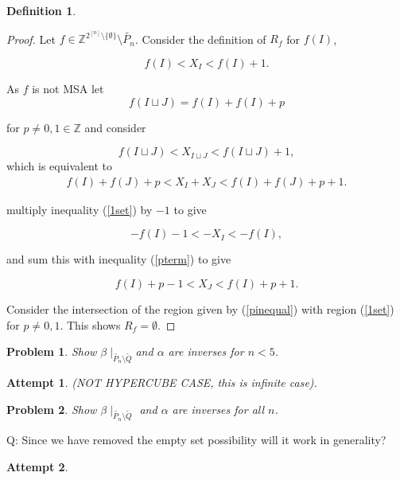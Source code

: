 \documentclass[a4paper,12pt]{article}
\newtheorem{problem}{Problem}
\newtheorem{attempt}{Attempt}
\theoremstyle{definition}
\newtheorem{definition}{Definition}[section]
\theoremstyle{indented}
\begin{document}
\begin{definition}
\begin{proof}
        Let $f \in \mathbb{Z}^{ 2^{[n]} \setminus \{\emptyset\}}  \setminus \tilde{P_n}$. Consider the definition of $R_f$ for $f(I)$,
        
        \begin{equation}\label{1set}
            f(I) < X_I < f(I) +1.
        \end{equation}
        
  As $f$ is not MSA let
        $$f(I \sqcup J)= f(I) + f(I) +p$$
        
        for $p \ne 0,1 \in \mathbb{Z}$ and consider
     
     
      $$f(I \sqcup J) < X_{I \sqcup J} < f(I \sqcup J) +1, $$
      which is equivalent to 
     \begin{align} \label{pterm}
   f(I) + f(J) +p < X_I + X_J < f(I) + f(J) +p +1.
     \end{align}
 
       multiply inequality (\ref{1set}) by $-1$ to give 

$$ -f(I) -1 < -X_I < -f(I),$$

and sum this with inequality (\ref{pterm}) to give

\begin{equation} \label{pinequal}
    f(I) + p -1 < X_J <  f(I) +p +1.
\end{equation}


Consider the intersection of the region given by (\ref{pinequal}) with region (\ref{1set}) for $p \ne 0,1$. This shows $R_f=\emptyset$. 

     \end{proof}
     
 
 \begin{problem}
   Show $\beta \mid _{\tilde{P_n}\setminus \tilde{Q}} $and $\alpha$ are inverses for $n<5$.
 \end{problem}

\begin{attempt} (NOT HYPERCUBE CASE, this is infinite case).

\end{attempt}

 \begin{problem}
   Show $\beta \mid _{\tilde{P_n}\setminus \tilde{Q}} $ and $\alpha$ are inverses for all $n$.
 \end{problem}
 
  Q: Since we have removed the empty set possibility will it work in generality? 
 
 \begin{attempt}
 

\end{attempt}
\end{definition}
\end{document}
